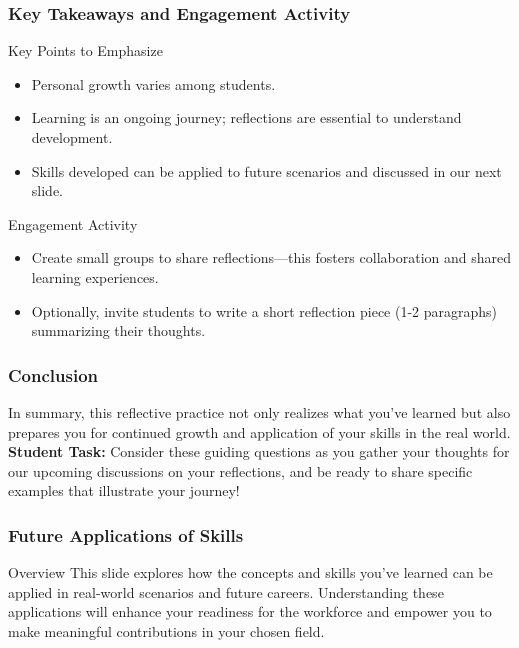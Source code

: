 \documentclass[aspectratio=169]{beamer}
\begin{document}
\begin{frame}[fragile]
    \frametitle{Key Takeaways and Engagement Activity}
    \begin{block}{Key Points to Emphasize}
        \begin{itemize}
            \item Personal growth varies among students.
            \item Learning is an ongoing journey; reflections are essential to understand development.
            \item Skills developed can be applied to future scenarios and discussed in our next slide.
        \end{itemize}
    \end{block}
    \begin{block}{Engagement Activity}
        \begin{itemize}
            \item Create small groups to share reflections—this fosters collaboration and shared learning experiences.
            \item Optionally, invite students to write a short reflection piece (1-2 paragraphs) summarizing their thoughts.
        \end{itemize}
    \end{block}
\end{frame}

\begin{frame}[fragile]
    \frametitle{Conclusion}
    In summary, this reflective practice not only realizes what you've learned but also prepares you for continued growth and application of your skills in the real world. 
    \newline
    \textbf{Student Task:} Consider these guiding questions as you gather your thoughts for our upcoming discussions on your reflections, and be ready to share specific examples that illustrate your journey!
\end{frame}

\begin{frame}[fragile]
    \frametitle{Future Applications of Skills}
    \begin{block}{Overview}
        This slide explores how the concepts and skills you’ve learned can be applied in real-world scenarios and future careers. 
        Understanding these applications will enhance your readiness for the workforce and empower you to make meaningful contributions in your chosen field.
    \end{block}
\end{frame}
\end{document}
